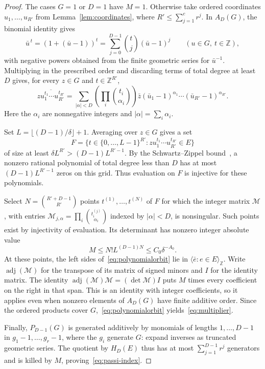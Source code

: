 \documentclass[11pt,a4paper,reqno]{amsart}
\theoremstyle{definition}
\theoremstyle{remark}
\numberwithin{equation}{section}
\newcommand{\Z}{\mathbb Z}
\newcommand{\spanZ}[1]{\langle #1\rangle_{\Z}}
\begin{document}
\begin{proof}
The cases $G=1$ or $D=1$ have $M=1$. Otherwise take ordered coordinates $u_1,\ldots,u_{R'}$ from Lemma~\ref{lem:coordinates}, where $R'\le\sum_{j=1}^c r^j$. In $A_D(G)$, the binomial identity gives
\[
 \bar u^{\,t}=(1+(\bar u-1))^t
 =\sum_{j=0}^{D-1}\binom tj(\bar u-1)^j
 \qquad(u\in G,\ t\in\Z),
\]
with negative powers obtained from the finite geometric series for $\bar u^{-1}$. Multiplying in the prescribed order and discarding terms of total degree at least $D$ gives, for every $z\in G$ and $t\in\Z^{R'}$,
\begin{equation}\label{eq:polynomialorbit}
 \overline{zu_1^{t_1}\cdots u_{R'}^{t_{R'}}}
 =\sum_{|\alpha|<D}\left(\prod_i\binom{t_i}{\alpha_i}\right)
 \bar z(\bar u_1-1)^{\alpha_1}\cdots(\bar u_{R'}-1)^{\alpha_{R'}}.
\end{equation}
Here the $\alpha_i$ are nonnegative integers and $|\alpha|=\sum_i\alpha_i$.

Set $L=\lfloor(D-1)/\delta\rfloor+1$. Averaging over $z\in G$ gives a set
\[
 F=\{t\in\{0,\ldots,L-1\}^{R'}:zu_1^{t_1}\cdots u_{R'}^{t_{R'}}\in E\}
\]
of size at least $\delta L^{R'}>(D-1)L^{R'-1}$. By the Schwartz--Zippel bound~\cite[Lemma 1 and Corollary 1]{Schwartz}, a nonzero rational polynomial of total degree less than $D$ has at most $(D-1)L^{R'-1}$ zeros on this grid. Thus evaluation on $F$ is injective for these polynomials.

Select $N=\binom{R'+D-1}{R'}$ points $t^{(1)},\ldots,t^{(N)}$ of $F$ for which the integer matrix $\mathcal M$, with entries $\mathcal M_{j,\alpha}=\prod_i\binom{t_i^{(j)}}{\alpha_i}$ indexed by $|\alpha|<D$, is nonsingular. Such points exist by injectivity of evaluation. Its determinant has nonzero integer absolute value
\[
 M\le N!L^{(D-1)N}\le C_0\delta^{-A_0}.
\]
At these points, the left sides of~\eqref{eq:polynomialorbit} lie in $\spanZ{\bar e:e\in E}$. Write $\operatorname{adj}(\mathcal M)$ for the transpose of its matrix of signed minors and $I$ for the identity matrix. The identity $\operatorname{adj}(\mathcal M)\mathcal M=(\det\mathcal M)I$ puts $M$ times every coefficient on the right in that span. This is an identity with integer coefficients, so it applies even when nonzero elements of $A_D(G)$ have finite additive order. Since the ordered products cover $G$,~\eqref{eq:polynomialorbit} yields~\eqref{eq:multiplier}.

Finally, $P_{D-1}(G)$ is generated additively by monomials of lengths $1,\ldots,D-1$ in $g_1-1,\ldots,g_r-1$, where the $g_i$ generate $G$: expand inverses as truncated geometric series. The quotient by $H_D(E)$ thus has at most $\sum_{j=1}^{D-1}r^j$ generators and is killed by $M$, proving~\eqref{eq:passi-index}.
\end{proof}
\end{document}
